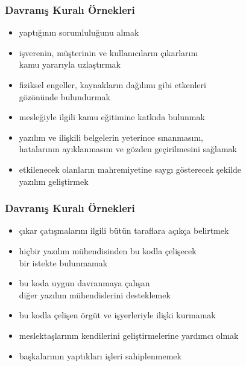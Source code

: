 \documentclass[dvipsnames]{beamer}
\theoremstyle{definition}
\theoremstyle{example}
\theoremstyle{plain}
\begin{document}
\begin{frame}
  \frametitle{Davranış Kuralı Örnekleri}

  \begin{itemize}
    \item yaptığının sorumluluğunu almak
    \item işverenin, müşterinin ve kullanıcıların çıkarlarını\\
      kamu yararıyla uzlaştırmak
    \item fiziksel engeller, kaynakların dağılımı gibi etkenleri\\
      gözönünde bulundurmak
    \item mesleğiyle ilgili kamu eğitimine katkıda bulunmak
    \item yazılım ve ilişkili belgelerin yeterince sınanmasını,\\
      hatalarının ayıklanmasını ve gözden geçirilmesini sağlamak
    \item etkilenecek olanların mahremiyetine saygı gösterecek şekilde\\
      yazılım geliştirmek
  \end{itemize}
\end{frame}

\begin{frame}
  \frametitle{Davranış Kuralı Örnekleri}

  \begin{itemize}
    \item çıkar çatışmalarını ilgili bütün taraflara açıkça belirtmek
    \item hiçbir yazılım mühendisinden bu kodla çelişecek\\
      bir istekte bulunmamak
    \item bu koda uygun davranmaya çalışan\\
      diğer yazılım mühendislerini desteklemek
    \item bu kodla çelişen örgüt ve işyerleriyle ilişki kurmamak
    \item meslektaşlarının kendilerini geliştirmelerine yardımcı olmak
    \item başkalarının yaptıkları işleri sahiplenmemek
  \end{itemize}
\end{frame}
\end{document}
